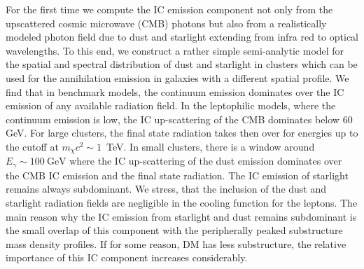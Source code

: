 \documentclass[10pt,aps,pra,reprint,amsmath,amsfonts,amssymb,showpacs,nofootinbib,floatfix]{revtex4-1}
\begin{document}
For the first time we compute the IC emission component not only from
the upscattered cosmic microwave (CMB) photons but also from a
realistically modeled photon field due to dust and starlight extending
from infra red to optical wavelengths. To this end, we construct a
rather simple semi-analytic model for the spatial and spectral
distribution of dust and starlight in clusters which can be used for
the annihilation emission in galaxies with a different spatial
profile.  We find that in benchmark models, the continuum emission
dominates over the IC emission of any available radiation field. In
the leptophilic models, where the continuum emission is low, the IC
up-scattering of the CMB dominates below 60 GeV. For large clusters,
the final state radiation takes then over for energies up to the
cutoff at $m_\chi c^2 \sim 1$~TeV. In small clusters, there is a
window around $E_\gamma \sim 100~\mathrm{GeV}$ where the IC
up-scattering of the dust emission dominates over the CMB IC emission
and the final state radiation. The IC emission of starlight remains
always subdominant.  We stress, that the inclusion of the dust and
starlight radiation fields are negligible in the cooling function for
the leptons.  The main reason why the IC emission from starlight and
dust remains subdominant is the small overlap of this component with
the peripherally peaked substructure mass density profiles. If for
some reason, DM has less substructure, the relative importance of this
IC component increases considerably.
\end{document}
